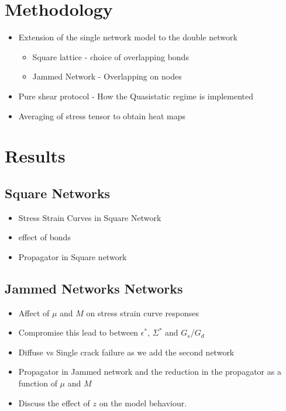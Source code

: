 \documentclass{library/duthesis}
\begin{document}
\section{Methodology}
\begin{itemize}
    \item Extension of the single network model to the double network
    \begin{itemize}
        \item Square lattice - choice of overlapping bonds
        \item Jammed Network - Overlapping on nodes
    \end{itemize}
    \item Pure shear protocol - How the Quasistatic regime is implemented
    \item Averaging of stress tensor to obtain heat maps
\end{itemize}

\section{Results}
\subsection{Square Networks}
\begin{itemize}
        \item Stress Strain Curves in Square Network
        \item effect of  bonds
        \item Propagator in Square network
\end{itemize}
\subsection{Jammed Networks Networks}
\begin{itemize}
    \item Affect of $\mu$ and $M$ on stress strain curve responses
    \item Compromise this lead to between $\epsilon^*$, $\Sigma^*$ and $G_s/G_d$
    \item Diffuse vs Single crack failure as we add the second network
    \item Propagator in Jammed network and the reduction in the propagator as a function of $\mu$ and $M$
    \item Discuss the effect of $z$ on the model behaviour.
\end{itemize}
\end{document}

